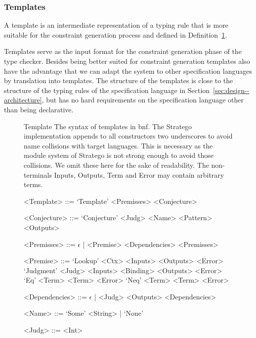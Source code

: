 \subsubsection{Templates}
A template is an intermediate representation of a typing rule that is
more suitable for the constraint generation process and defined in
Definition~\ref{def:template}.

Templates serve as the input format for the constraint generation
phase of the type checker. Besides being better suited for constraint
generation templates also have the advantage that we can adapt the
system to other specification languages by translation into
templates. The structure of the templates is close to the structure of
the typing rules of the specification language in
Section~\ref{sec:design--architecture}, but has no hard requirements
on the specification language other than being declarative.

\begin{figure}
\begin{definition}{Template}
   The syntax of templates in \gls{bnf}. The
  Stratego implementation appends to all constructors two underscores
  to avoid name collisions with target languages. This is necessary as
  the module system of Stratego is not strong enough to avoid those
  collisions. We omit these here for the sake of readability. The
  non-terminals Inputs, Outputs, Term and Error may contain arbitrary
  terms.
  \begin{grammar}
    <Template> ::= `Template' <Premisses> <Conjecture>

    <Conjecture> ::= `Conjecture' <Judg> <Name> <Pattern> <Outputs>

    <Premisses> ::= $\epsilon$ | <Premise> <Dependencies> <Premisses>

    <Premise> ::= `Lookup' <Ctx> <Inputs> <Outputs> <Error>
    \alt `Judgment' <Judg> <Inputs> <Binding> <Outputs> <Error>
    \alt `Eq' <Term> <Term> <Error>
    \alt `Neq' <Term> <Term> <Error>

    <Dependencies> ::= $\epsilon$ | <Judg> <Outputs> <Dependencies>

    <Name> ::= `Some' <String> | `None'

    <Judg> ::= <Int>
  \end{grammar}
\label{def:template}
\end{definition}
\end{figure}


